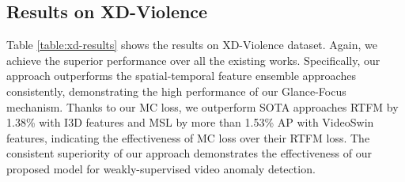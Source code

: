\documentclass[letterpaper]{article} \usepackage{aaai23}  \usepackage{times}  \usepackage{helvet}  \usepackage{courier}  \usepackage[hyphens]{url}  \usepackage{graphicx} \urlstyle{rm} \def\UrlFont{\rm}  \usepackage{natbib}  \usepackage{caption} \frenchspacing  \setlength{\pdfpagewidth}{8.5in}  \setlength{\pdfpageheight}{11in}  \usepackage{algorithm}
\begin{document}
\vspace*{-1mm}
\subsection{Results on XD-Violence}
Table \ref{table:xd-results} shows the results on XD-Violence dataset. Again, we achieve the superior performance over all the existing works. Specifically, our approach outperforms the spatial-temporal feature ensemble approaches \cite{Not-only-look,LCTR,RTFM} consistently, demonstrating the high performance of our Glance-Focus mechanism. Thanks to our MC loss, we outperform SOTA approaches RTFM \cite{RTFM} by 1.38\% with I3D features and MSL \cite{MSL} by more than 1.53\% AP with VideoSwin features, indicating the effectiveness of MC loss over their RTFM loss. The consistent superiority of our approach demonstrates the effectiveness of our proposed model for weakly-supervised video anomaly detection.
\end{document}

